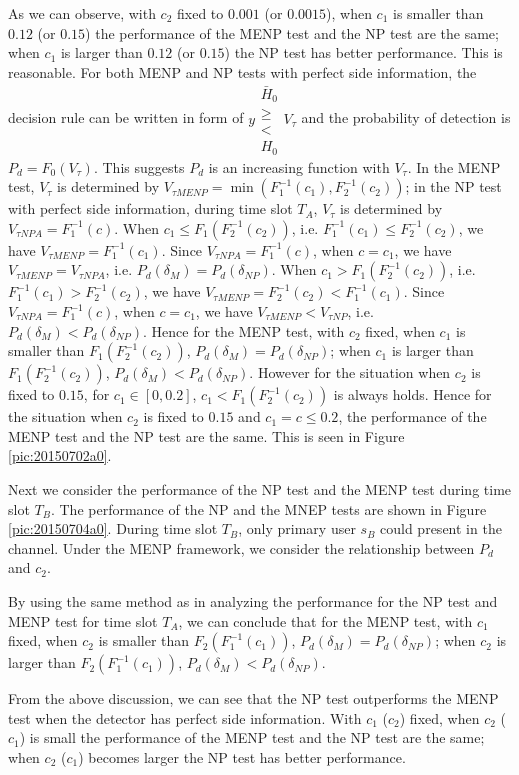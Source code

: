 As we can observe, with $c_2$  fixed to $0.001$ (or $0.0015$), when $c_1$ is smaller than $0.12$ (or $0.15$) the performance of the MENP test and the NP test are the same; when $c_1$ is larger than $0.12$ (or $0.15$) the NP test has better performance. This is reasonable.  
For both MENP and NP tests with perfect side information, the decision rule can be written in form of $  y  \substack{\bar{H}_0 \\ \geq \\ < \\ H_0} V_\tau $ and the probability of detection is $ P_d = F_0(V_\tau)$. This suggests $P_d$ is an increasing function with $V_\tau$. 
In the MENP test, $V_\tau$ is determined by $V_{\tau MENP}= \min (F_1^{-1}(c_1), F_2^{-1}(c_2))$; in the NP test with perfect side information, during time slot $T_A$, $V_\tau$ is determined by $V_{\tau NP A} = F_1^{-1}(c)$. When $c_1 \leq F_1(F_2^{-1}(c_2))$, i.e. $F_1^{-1}(c_1) \leq  F_2^{-1}(c_2)$, we have  $V_{\tau MENP} = F_1^{-1}(c_1)$. Since $V_{\tau NP A} = F_1^{-1}(c)$, when $c = c_1$, we have $V_{\tau MENP} = V_{\tau NPA}$, i.e.  $P_d(\delta_M) = P_d(\delta_{NP})$.    
When $c_1 > F_1(F_2^{-1}(c_2))$, i.e. $F_1^{-1}(c_1) > F_2^{-1}(c_2)$, we have  $V_{\tau MENP} = F_2^{-1}(c_2) < F_1^{-1}(c_1)$. Since $V_{\tau NP A} = F_1^{-1}(c)$, when $c = c_1$, we have 
$V_{\tau MENP} < V_{\tau NP}$, i.e.  $P_d(\delta_M) < P_d(\delta_{NP})$.
Hence for the MENP test, with $c_2$ fixed, when $c_1$ is smaller than $F_1( F_2^{-1}(c_2) ) $, $P_d(\delta_M) = P_d(\delta_{NP})$; when $c_1$ is larger than $ F_1( F_2^{-1}(c_2))$, $P_d(\delta_M) < P_d(\delta_{NP})$. 
However for the situation when  $c_2$ is fixed to $0.15$, for $c_1 \in [0, 0.2]$, $c_1 <  F_1(F_2^{-1}(c_2))$ is always holds. Hence for the situation when $c_2$ is fixed to $0.15$ and $c_1 = c \leq 0.2$, the performance of the MENP test and the NP test are the same. This is seen in Figure \ref{pic:20150702a0}. 

Next we consider the performance of the NP test and the MENP test during time slot $T_B$.
The performance of the NP and the MNEP tests are shown in Figure \ref{pic:20150704a0}. During time slot $T_B$, only primary user $s_B$ could present in the channel. Under the MENP framework, we consider the relationship between $P_d$ and $c_2$. 

By using the same method as in analyzing the performance for the NP test and MENP test for time slot $T_A$, we can conclude that
 for the MENP test, with $c_1$ fixed, when $c_2$ is smaller than $ F_2( F_1^{-1}(c_1)) $, $P_d(\delta_M) = P_d(\delta_{NP})$; when $c_2$ is larger than $ F_2( F_1^{-1}(c_1)) $, $P_d(\delta_M) < P_d(\delta_{NP})$. 

From the above discussion, we can see that the NP test outperforms the MENP test when the detector has perfect side information. With $c_1$ ($c_2$) fixed, when $c_2$ ($c_1$) is small the performance of the  MENP test and the NP test are the same; when $c_2$ ($c_1$) becomes larger the NP test has better performance.  